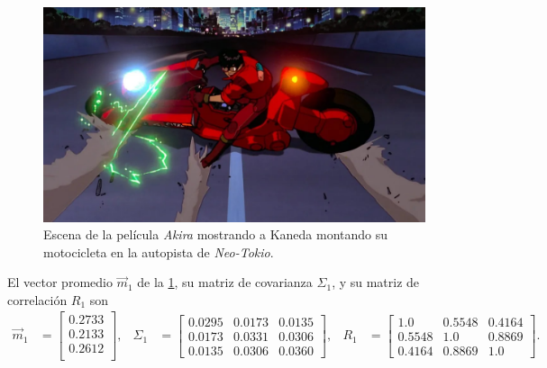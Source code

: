 \begin{figure}[ht!]
    \centering
    \includegraphics[scale=0.2]{../pictures/akira.jpg}
    \caption{Escena de la película \textit{Akira} mostrando a Kaneda montando su motocicleta en la autopista de \textit{Neo-Tokio}.}
    \label{fig:akira-bike}
\end{figure}

El vector promedio $\vec{m}_1$ de la \cref{fig:akira-bike}, su matriz de covarianza $\Sigma_1$, y su matriz de correlación $R_1$ son
\begin{align*}
    \vec{m}_1 & =
    \begin{bmatrix}
        0.2733 \\
        0.2133 \\
        0.2612 \\
    \end{bmatrix}, &
    \Sigma_1 & =
    \begin{bmatrix}
        0.0295 & 0.0173 & 0.0135 \\
        0.0173 & 0.0331 & 0.0306 \\
        0.0135 & 0.0306 & 0.0360 
    \end{bmatrix}, &
    R_1 & = 
    \begin{bmatrix}
        1.0    & 0.5548 & 0.4164 \\
        0.5548 & 1.0    & 0.8869 \\
        0.4164 & 0.8869 & 1.0
    \end{bmatrix}.
\end{align*}

